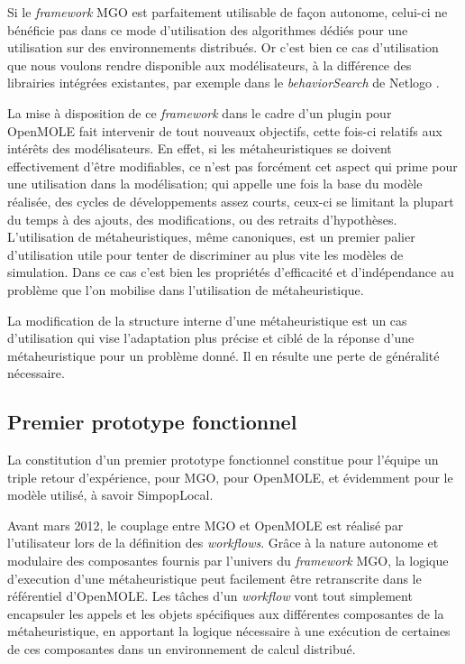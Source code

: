 Si le \textit{framework} MGO est parfaitement utilisable de façon autonome, celui-ci ne bénéficie pas dans ce mode d'utilisation des algorithmes dédiés pour une utilisation sur des environnements distribués. Or c'est bien ce cas d'utilisation que nous voulons rendre disponible aux modélisateurs, à la différence des librairies intégrées existantes, par exemple dans le \textit{behaviorSearch} de Netlogo \autocite{Stonedahl2011a}.

La mise à disposition de ce \textit{framework} dans le cadre d'un plugin pour OpenMOLE fait intervenir de tout nouveaux objectifs, cette fois-ci relatifs aux intérêts des modélisateurs. En effet, si les métaheuristiques se doivent effectivement d'être modifiables, ce n'est pas forcément cet aspect qui prime pour une utilisation dans la modélisation; qui appelle une fois la base du modèle réalisée, des cycles de développements assez courts, ceux-ci se limitant la plupart du temps à des ajouts, des modifications, ou des retraits d'hypothèses. L'utilisation de métaheuristiques, même canoniques, est un premier palier d'utilisation utile pour tenter de discriminer au plus vite les modèles de simulation. Dans ce cas c'est bien les propriétés d'efficacité et d'indépendance au problème que l'on mobilise dans l'utilisation de métaheuristique.

La modification de la structure interne d'une métaheuristique est un cas d'utilisation qui vise l'adaptation plus précise et ciblé de la réponse d'une métaheuristique pour un problème donné. Il en résulte une perte de généralité nécessaire.

\subsection{Premier prototype fonctionnel}
\label{p:prototype_fonctionel}

La constitution d'un premier prototype fonctionnel constitue pour l'équipe un triple retour d'expérience, pour MGO, pour OpenMOLE, et évidemment pour le modèle utilisé, à savoir SimpopLocal.

Avant mars 2012, le couplage entre MGO et OpenMOLE est réalisé par l'utilisateur lors de la définition des \textit{workflows}. Grâce à la nature autonome et modulaire des composantes fournis par l'univers du \textit{framework} MGO, la logique d'execution d'une métaheuristique peut facilement être retranscrite dans le référentiel d'OpenMOLE. Les tâches d'un \textit{workflow} vont tout simplement encapsuler les appels et les objets spécifiques aux différentes composantes de la métaheuristique, en apportant la logique nécessaire à une exécution de certaines de ces composantes dans un environnement de calcul distribué.

